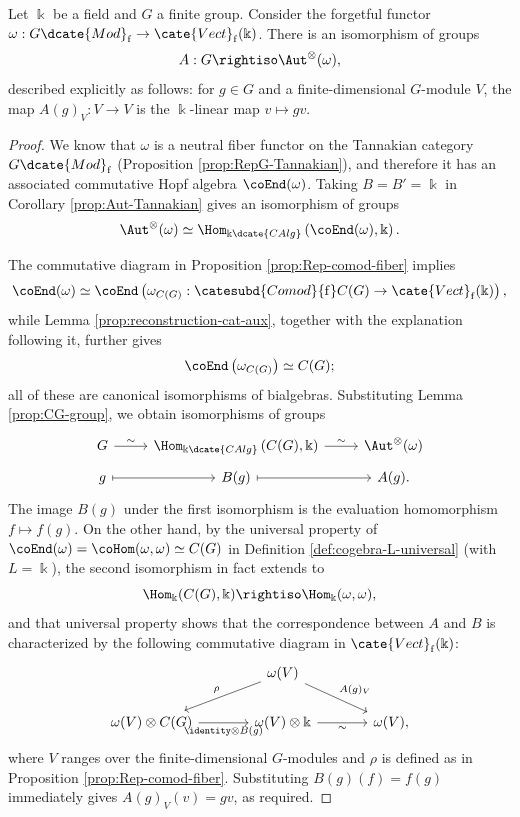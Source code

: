 \begin{theorem}\label{prop:Tannaka-Krein}
	Let $\Bbbk$ be a field and $G$ a finite group. Consider the forgetful functor $\omega:G\dcate{Mod}_{\mathrm{f}}\to\cate{Vect}_{\mathrm{f}}(\Bbbk)$. There is an isomorphism of groups
	\[ A: G \rightiso \Aut^\otimes(\omega), \]
	described explicitly as follows: for $g\in G$ and a finite-dimensional $G$-module $V$, the map $A(g)_V:V\to V$ is the $\Bbbk$-linear map $v\mapsto gv$.
\end{theorem}
\begin{proof}
	We know that $\omega$ is a neutral fiber functor on the Tannakian category $G\dcate{Mod}_{\mathrm{f}}$ (Proposition \ref{prop:RepG-Tannakian}), and therefore it has an associated commutative Hopf algebra $\coEnd(\omega)$. Taking $B=B'=\Bbbk$ in Corollary \ref{prop:Aut-Tannakian} gives an isomorphism of groups
	\[ \Aut^{\otimes}(\omega) \simeq \Hom_{\Bbbk\dcate{CAlg}}\left(\coEnd(\omega), \Bbbk \right). \]

	The commutative diagram in Proposition \ref{prop:Rep-comod-fiber} implies
	\[ \coEnd(\omega) \simeq \coEnd\left(\omega_{C(G)}: \catesubd{Comod}{\mathrm{f}}C(G) \to \cate{Vect}_{\mathrm{f}}(\Bbbk) \right), \]
	while Lemma \ref{prop:reconstruction-cat-aux}, together with the explanation following it, further gives
	\[ \coEnd\left( \omega_{C(G)} \right) \simeq C(G); \]
	all of these are canonical isomorphisms of bialgebras. Substituting Lemma \ref{prop:CG-group}, we obtain isomorphisms of groups
	\[\begin{tikzcd}[row sep=tiny]
		G \arrow[r, "\sim"] & \Hom_{\Bbbk\dcate{CAlg}}\left(C(G), \Bbbk \right) \arrow[r, "\sim"] & \Aut^{\otimes}(\omega) \\
		g \arrow[mapsto, r] & B(g) \arrow[mapsto, r] & A(g).
	\end{tikzcd}\]
	The image $B(g)$ under the first isomorphism is the evaluation homomorphism $f\mapsto f(g)$. On the other hand, by the universal property of $\coEnd(\omega)=\coHom(\omega,\omega)\simeq C(G)$ in Definition \ref{def:cogebra-L-universal} (with $L=\Bbbk$), the second isomorphism in fact extends to
	\[ \Hom_{\Bbbk}(C(G), \Bbbk) \rightiso \Hom_{\Bbbk}(\omega, \omega), \]
	and that universal property shows that the correspondence between $A$ and $B$ is characterized by the following commutative diagram in $\cate{Vect}_{\mathrm{f}}(\Bbbk)$:
	\[\begin{tikzcd}[column sep=large]
		& \omega(V) \arrow[ld, "\rho"'] \arrow[rd, "{A(g)_V}"] & \\
		\omega(V) \otimes C(G) \arrow[r, "{\identity \otimes B(g)}"'] & \omega(V) \otimes \Bbbk \arrow[r, "\sim"'] & \omega(V),
	\end{tikzcd}\]
	where $V$ ranges over the finite-dimensional $G$-modules and $\rho$ is defined as in Proposition \ref{prop:Rep-comod-fiber}. Substituting $B(g)(f)=f(g)$ immediately gives $A(g)_V(v)=gv$, as required.
\end{proof}

